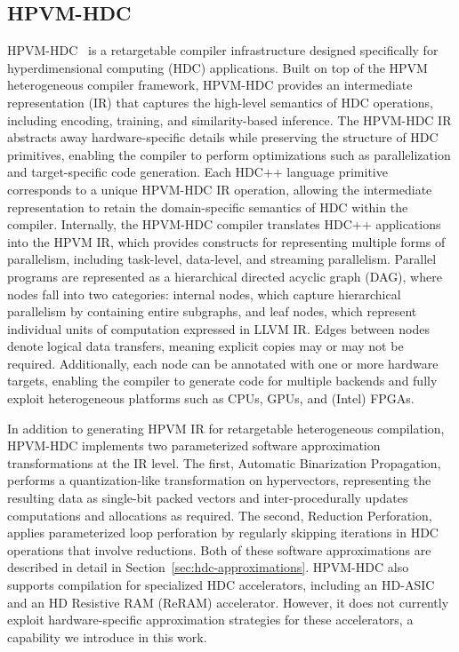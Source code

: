 % 


        

\subsection{HPVM-HDC}
\label{bg:hpvm-hdc}
HPVM-HDC~\cite{hpvm-hdc} is a retargetable compiler infrastructure designed specifically for hyperdimensional computing (HDC) applications. Built on top of the HPVM~\cite{kotsifakou2018hpvm, ejjeh2022hpvm} heterogeneous compiler framework, HPVM-HDC provides an intermediate representation (IR) that captures the high-level semantics of HDC operations, including encoding, training, and similarity-based inference. The HPVM-HDC IR abstracts away hardware-specific details while preserving the structure of HDC primitives, enabling the compiler to perform optimizations such as parallelization and target-specific code generation. 
Each HDC++ language primitive corresponds to a unique HPVM-HDC IR operation, allowing the intermediate representation to retain the domain-specific semantics of HDC within the compiler. Internally, the HPVM-HDC compiler translates HDC++ applications into the HPVM IR, which provides constructs for representing multiple forms of parallelism, including task-level, data-level, and streaming parallelism. Parallel programs are represented as a hierarchical directed acyclic graph (DAG), where nodes fall into two categories: internal nodes, which capture hierarchical parallelism by containing entire subgraphs, and leaf nodes, which represent individual units of computation expressed in LLVM IR. Edges between nodes denote logical data transfers, meaning explicit copies may or may not be required. Additionally, each node can be annotated with one or more hardware targets, enabling the compiler to generate code for multiple backends and fully exploit heterogeneous platforms such as CPUs, GPUs, and (Intel) FPGAs.

In addition to generating HPVM IR for retargetable heterogeneous compilation, HPVM-HDC implements two parameterized software approximation transformations at the IR level. The first, Automatic Binarization Propagation, performs a quantization-like transformation on hypervectors, representing the resulting data as single-bit packed vectors and inter-procedurally updates computations and allocations as required. The second, Reduction Perforation, applies parameterized loop perforation by regularly skipping iterations in HDC operations that involve reductions. Both of these software approximations are described in detail in Section~\ref{sec:hdc-approximations}. HPVM-HDC also supports compilation for specialized HDC accelerators, including an HD-ASIC and an HD Resistive RAM (ReRAM) accelerator. However, it does not currently exploit hardware-specific approximation strategies for these accelerators, a capability we introduce in this work.

